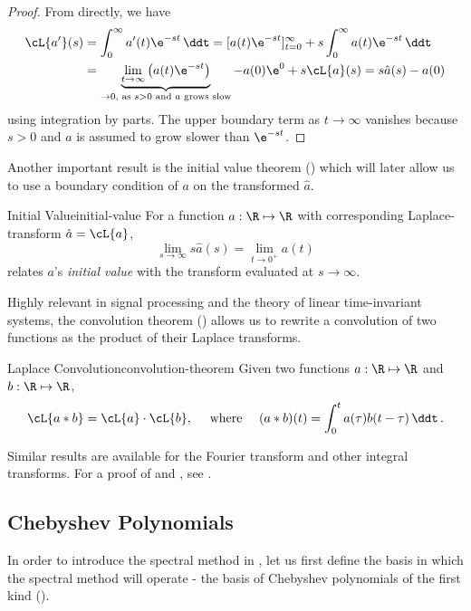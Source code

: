 \documentclass{prettytex/ox/mmsc-special-topic}
\begin{document}
  \begin{proof}
    From  directly, we have
    \begin{align*}
      \cL\{a'\}(s) & = \int_{0}^{\infty} a'(t) \e^{-st} \,\ddt = [a(t) \e^{-st}]_{t=0}^{\infty} + s \int_{0}^{\infty} a(t) \e^{-st} \,\ddt                                                                         \\
                   & = \underbrace{\lim_{t \rightarrow \infty} \left(a(t) \e^{-st}\right)}_{\rightarrow 0, \text{ as } s > 0 \text{ and } a \text{ grows slow}} - a(0) \e^{0} + s \cL\{a\}(s) = s\hat{a}(s) - a(0)
    \end{align*}
    using integration by parts. The upper boundary term as $t \rightarrow \infty$ vanishes because $s > 0$ and $a$ is assumed to grow slower than $\e^{-st}$.
  \end{proof}

  Another important result is the initial value theorem () which will later allow us to use a boundary condition of $a$ on the transformed $\hat{a}$.

  \begin{theorem}{Initial Value}{initial-value}
    For a function $a: \R \mapsto \R$ with corresponding Laplace-transform $\hat{a} = \cL\{a\}$,
    $$\lim_{s \rightarrow \infty} s \hat{a}(s) = \lim_{t \rightarrow 0^+} a(t)$$
    relates $a$'s \textit{initial value} with the transform evaluated at $s \rightarrow \infty$.
  \end{theorem}

  Highly relevant in signal processing and the theory of linear time-invariant systems, the convolution theorem () allows us to rewrite a convolution of two functions as the product of their Laplace transforms.

  \begin{theorem}{Laplace Convolution}{convolution-theorem}
    Given two functions $a: \R \mapsto \R$ and $b: \R \mapsto \R$,
    $$\cL\{a * b\} = \cL\{a\} \cdot \cL\{b\}, \quad \text{ where }\quad (a * b)(t) = \int_{0}^{t} a(\tau) b(t-\tau)\,\ddt\,.$$
  \end{theorem}

  Similar results are available for the Fourier transform and other integral transforms.
  For a proof of  and , see \cite{laplace-transforms}.
  \vspace*{-0.4cm}

  \subsection{Chebyshev Polynomials}
  \vspace*{-0.2cm}
  In order to introduce the spectral method in , let us first define the basis in which the spectral method will operate - the basis of Chebyshev polynomials of the first kind ().
\end{document}
